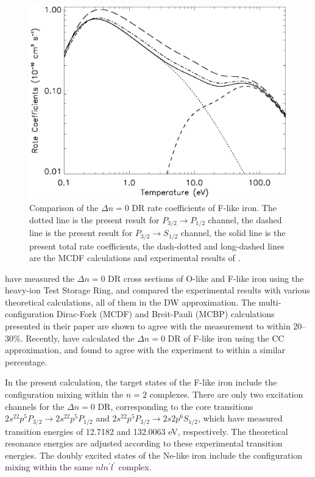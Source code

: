 \documentclass{elsart}
\begin{document}
\begin{figure}
\includegraphics[width=5in]{rate.eps}
\caption{\label{fig_rate} Comparison of the $\Delta n = 0$ DR rate
coefficients of F-like iron. The dotted line is the present result for
$P_{3/2}\to P_{1/2}$ channel, the dashed line is the present result for
$P_{3/2}\to S_{1/2}$ channel, the solid line is the present total rate
coefficients, the dash-dotted and long-dashed lines are the MCDF calculations
and experimental results of \citet{savin99}.}
\end{figure}

\citet{savin99} have measured the $\Delta n = 0$ DR cross sections of O-like
and F-like iron 
using the heavy-ion Test Storage Ring, and compared the experimental results
with various theoretical calculations, all of them in the DW approximation. The
multi-configuration Dirac-Fork (MCDF) and Breit-Pauli (MCBP) calculations
presented in their paper are shown to agree with the measurement to within
20--30\%. Recently, \citet{pradhan01} have calculated the $\Delta n = 0$ DR
of F-like iron using the CC approximation, and found to agree with the
experiment to within a similar percentage. 

In the present calculation, the target states of the F-like iron include the 
configuration mixing within the $n = 2$ complexes. There are only
two excitation channels for the $\Delta n = 0$ DR, corresponding to the core
transitions $2s^22p^5 P_{3/2}\to 2s^22p^5 P_{1/2}$ and $2s^22p^5 P_{3/2}\to
2s2p^6 S_{1/2}$, which have measured transition energies of 12.7182 and
132.0063 eV, respectively. The theoretical resonance energies are adjusted 
according to these experimental transition energies. The doubly excited states
of the Ne-like iron include the configuration mixing within the same
$nln^\prime l^\prime$ complex. 
\end{document}
